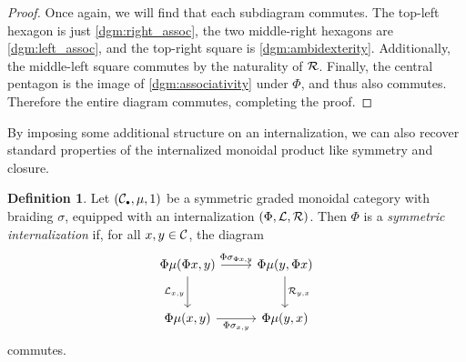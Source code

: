 \documentclass[openany, amssymb, psamsfonts]{amsart}
\theoremstyle{definition}
\newtheorem{defn}{Definition}[section]
\numberwithin{equation}{section}
\begin{document}
\begin{proof}
\vspace{0.5em}


\noindent Once again, we will find that each subdiagram commutes. The top-left hexagon is just \eqref{dgm:right_assoc}, the two middle-right hexagons are \eqref{dgm:left_assoc}, and the top-right square is \eqref{dgm:ambidexterity}. Additionally, the middle-left square commutes by the naturality of $\mathcal{R}$. Finally, the central pentagon is the image of \eqref{dgm:associativity} under $\Phi$, and thus also commutes. Therefore the entire diagram commutes, completing the proof.
\end{proof}

By imposing some additional structure on an internalization, we can also recover standard properties of the internalized monoidal product like symmetry and closure.

\begin{defn} \label{def:symmetric_internalization}
Let $(\C_\sbull, \mu, 1)$ be a symmetric graded monoidal category with braiding $\sigma$, equipped with an internalization $(\Phi, \mathcal{L}, \mathcal{R})$. Then $\Phi$ is a \emph{symmetric internalization} if, for all $x, y \in \mathcal{C}$, the diagram
\begin{equation*}
    \begin{tikzcd}[row sep = 2.5em]
        \Phi\mu(\Phi x, y) \ar[r, "{\Phi \sigma_{\Phi x, y}}"] \ar[d, "{\calL_{x, y}}"'] & \Phi\mu(y, \Phi x) \ar[d, "{\calR_{y, x}}"]\\
        \Phi\mu(x, y) \ar[r, "{\Phi \sigma_{x, y}}"'] & \Phi\mu(y, x)
    \end{tikzcd}
\end{equation*} commutes.
\end{defn}
\end{document}

